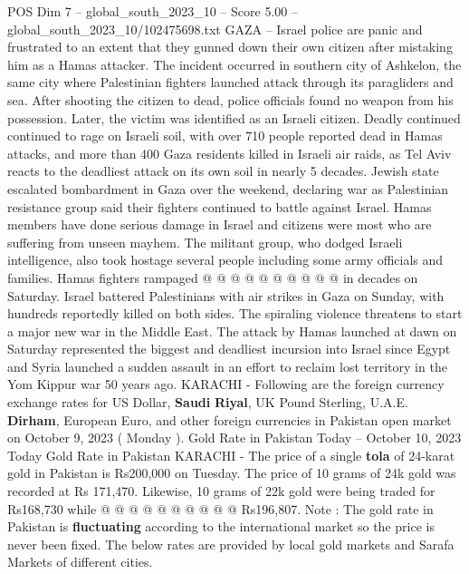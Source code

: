 \begin{textsample}{POS Dim 7 – global\_south\_2023\_10 – Score 5.00 – global\_south\_2023\_10/102475698.txt}  \label{ex:f7_pos_134}
GAZA -- Israel police are panic and frustrated to an extent that they gunned down their own citizen after mistaking him as a Hamas attacker.
The incident occurred in southern city of Ashkelon, the same city where Palestinian fighters launched attack through its paragliders and sea.
After shooting the citizen to dead, police officials found no weapon from his possession.
Later, the victim was identified as an Israeli citizen.
Deadly continued continued to rage on Israeli soil, with over 710 people reported dead in Hamas attacks, and more than 400 Gaza residents killed in Israeli air raids, as Tel Aviv reacts to the deadliest attack on its own soil in nearly 5 decades.
Jewish state escalated bombardment in Gaza over the weekend, declaring war as Palestinian resistance group said their fighters continued to battle against Israel.
Hamas members have done serious damage in Israel and citizens were most who are suffering from unseen mayhem.
The militant group, who dodged Israeli intelligence, also took hostage several people including some army officials and families.
Hamas fighters rampaged @ @ @ @ @ @ @ @ @ @ in decades on Saturday.
Israel battered Palestinians with air strikes in Gaza on Sunday, with hundreds reportedly killed on both sides.
The spiraling violence threatens to start a major new war in the Middle East.
The attack by Hamas launched at dawn on Saturday represented the biggest and deadliest incursion into Israel since Egypt and Syria launched a sudden assault in an effort to reclaim lost territory in the Yom Kippur war 50 years ago.
KARACHI - Following are the foreign currency exchange rates for US Dollar, \textbf{Saudi} \textbf{Riyal}, UK Pound Sterling, U.A.E. \textbf{Dirham}, European Euro, and other foreign currencies in Pakistan open market on October 9, 2023 ( Monday ).
Gold Rate in Pakistan Today -- October 10, 2023 Today Gold Rate in Pakistan KARACHI - The price of a single \textbf{tola} of 24-karat gold in Pakistan is Rs200,000 on Tuesday.
The price of 10 grams of 24k gold was recorded at Rs 171,470.
Likewise, 10 grams of 22k gold were being traded for Rs168,730 while @ @ @ @ @ @ @ @ @ @ Rs196,807.
Note : The gold rate in Pakistan is \textbf{fluctuating} according to the international market so the price is never been fixed.
The below rates are provided by local gold markets and Sarafa Markets of different cities.

\end{textsample}
